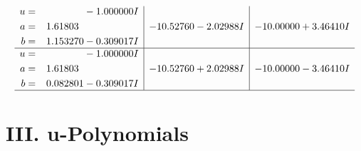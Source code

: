 \documentclass[1p]{elsarticle_modified}
\theoremstyle{definition}
\begin{document}
$$\begin{array}{c|c|c}
\begin{aligned}
u &= \phantom{-0.000000 } -1.000000 I \\
a &= \phantom{-}1.61803\phantom{ +0.000000I} \\
b &= \phantom{-}1.153270 - 0.309017 I\end{aligned}
 & -10.52760 - 2.02988 I & -10.00000 + 3.46410 I \\ \hline\begin{aligned}
u &= \phantom{-0.000000 } -1.000000 I \\
a &= \phantom{-}1.61803\phantom{ +0.000000I} \\
b &= \phantom{-}0.082801 - 0.309017 I\end{aligned}
 & -10.52760 + 2.02988 I & -10.00000 - 3.46410 I\\
 \hline 
 \end{array}$$\newpage
\newpage\renewcommand{\arraystretch}{1}
\centering \section*{ III. u-Polynomials}
\end{document}
